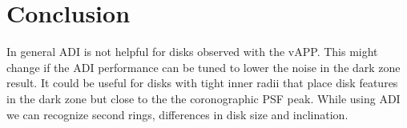 \section{Conclusion}
In general \ac{ADI} is not helpful for disks observed with the \ac{vAPP}. This might change if the \ac{ADI} performance can be tuned to lower the noise in the dark zone result. It could be useful for disks with tight inner radii that place disk features in the dark zone but close to the the coronographic \ac{PSF} peak. While using \ac{ADI} we can recognize second rings, differences in disk size and inclination. 

